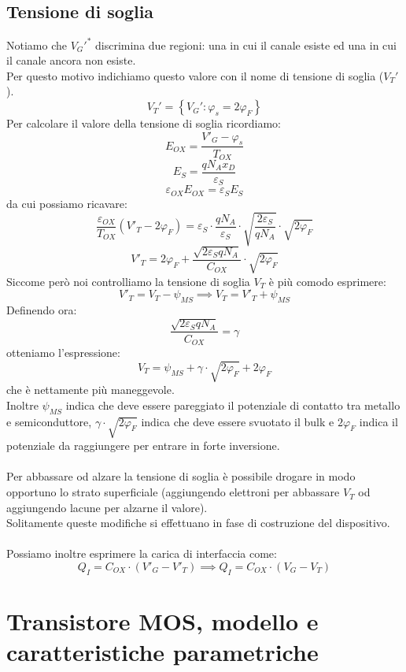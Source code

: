 \documentclass{article}
\numberwithin{equation}{subsection}
\begin{document}
	\subsection{Tensione di soglia}
	Notiamo che $V_G'^*$ discrimina due regioni: una in cui il canale esiste ed una in cui il canale ancora non esiste.\\
	Per questo motivo indichiamo questo valore con il nome di tensione di soglia ($V_T'$).
	$$V_T' = \left\{ V_G' : \varphi_s = 2\varphi_F \right\}$$
	Per calcolare il valore della tensione di soglia ricordiamo:
	$$E_{OX} = \frac{V'_G - \varphi_s}{T_{OX}}$$
	$$E_S = \frac{q N_A x_D}{\varepsilon_S}$$
	$$\varepsilon_{OX} E_{OX} = \varepsilon_S E_S$$
	da cui possiamo ricavare:
	$$\frac{\varepsilon_{OX}}{T_{OX}} \left( V'_T - 2\varphi_F \right) = \varepsilon_S \cdot \frac{q N_A}{\varepsilon_S} \cdot \sqrt{\frac{2\varepsilon_S}{q N_A}} \cdot \sqrt{2\varphi_F}$$
	$$V'_T = 2\varphi_F + \frac{\sqrt{2\varepsilon_S q N_A}}{C_{OX}} \cdot \sqrt{2\varphi_F}$$
	Siccome però noi controlliamo la tensione di soglia $V_T$ è più comodo esprimere:
	$$V'_T = V_T - \psi_{MS} \implies V_T = V'_T + \psi_{MS}$$
	Definendo ora:
	$$\frac{\sqrt{2\varepsilon_S q N_A}}{C_{OX}} = \gamma$$
	otteniamo l'espressione:
	$$V_T = \psi_{MS} + \gamma \cdot \sqrt{2\varphi_F} + 2\varphi_F$$
	che è nettamente più maneggevole.\\
	Inoltre $\psi_{MS}$ indica che deve essere pareggiato il potenziale di contatto tra metallo e semiconduttore, $\gamma \cdot \sqrt{2\varphi_F}$ indica che deve essere svuotato il bulk e $2\varphi_F$ indica il potenziale da raggiungere per entrare in forte inversione.\\\\
	Per abbassare od alzare la tensione di soglia è possibile drogare in modo opportuno lo strato superficiale (aggiungendo elettroni per abbassare $V_T$ od aggiungendo lacune per alzarne il valore).\\
	Solitamente queste modifiche si effettuano in fase di costruzione del dispositivo.\\\\
	Possiamo inoltre esprimere la carica di interfaccia come:
	$$Q_I = C_{OX} \cdot \left( V'_G - V'_T \right) \implies Q_I = C_{OX} \cdot (V_G - V_T)$$
	\section{Transistore MOS, modello e caratteristiche parametriche}
\end{document}

